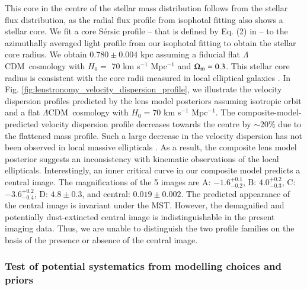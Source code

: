 \documentclass[longauth]{aa}
\newcommand{\lcdm}{$\Lambda$CDM}
\newcommand{\ajs}[1]{{{#1}}}
\newcommand{\ajsii}[1]{{{#1}}}
\newcommand{\ajsiv}[1]{{{#1}}}
\begin{document}
This core in the centre of the stellar mass distribution follows from the stellar flux distribution, as the radial flux profile from isophotal fitting also shows a stellar core. \ajs{We fit a core S\'ersic profile -- that is defined by Eq. (2) in \citet{Dullo19} -- to the azimuthally averaged light profile from our isophotal fitting to obtain the stellar core radius. We obtain $0.780\pm0.004$ kpc assuming a fiducial flat \lcdm\ cosmology with $H_0 = $ 70 km s$^{-1}$ Mpc$^{-1}$ and $\Omega_{\rm m} = 0.3$. This stellar core radius is consistent with the core radii measured in local elliptical galaxies \citep[0.64--2.73 kpc;][]{Bonfini16, Dullo19}.} \ajsii{In Fig. \ref{fig:lenstronomy_velocity_dispersion_profile}, we illustrate the velocity dispersion profiles predicted by the lens model posteriors assuming isotropic orbit and a flat \lcdm\ cosmology with $H_0 = 70$ km s$^{-1}$ Mpc$^{-1}$. The composite-model-predicted velocity dispersion profile decreases towards the centre by $\sim$20\% due to the flattened mass profile. Such a large decrease in the velocity dispersion has not been observed in local massive ellipticals \citep[e.g.][]{Cappellari16, Ene19}. As a result, the composite lens model posterior \ajsiv{suggests an} inconsistency with kinematic observations of the local ellipticals.} Interestingly, an inner critical curve in our composite model predicts a central image. The magnifications of the 5 images are A: $-1.6_{-0.2}^{+0.1}$, B: $4.0_{-0.3}^{+0.2}$, C: $-3.6_{-0.4}^{+0.2}$, D: $4.8\pm0.3$, and central: $0.019\pm0.002$. \ajs{The predicted appearance} of the central image is invariant under the MST. However, the demagnified and potentially dust-extincted central image is indistinguishable in the present imaging data. Thus, we are unable to distinguish the two profile families on the basis of the presence or absence of the central image.

\subsubsection{Test of potential systematics from modelling choices and priors} \label{sec:lenstronomy_halo_prior_systematic_test}
\end{document}
